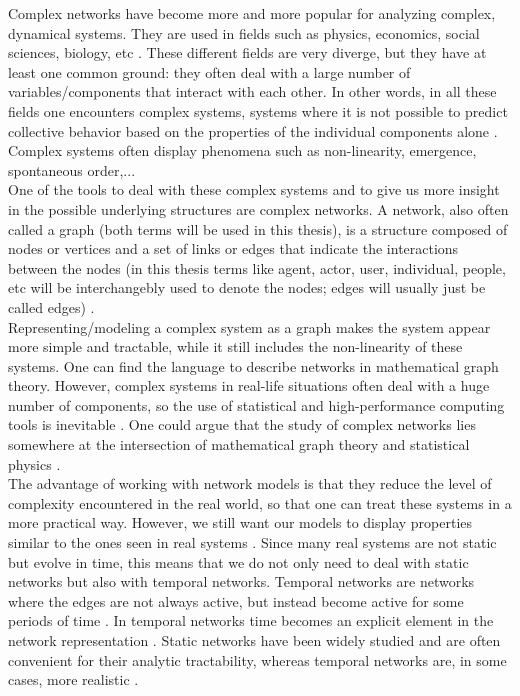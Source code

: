 \documentclass[11 pt , letterpaper , twoside , openright]{book}
\begin{document}
Complex networks have become more and more popular for analyzing complex, dynamical systems. They are used in fields such as physics, economics, social sciences, biology, etc \cite{Costa2008}. These different fields are very diverge, but they have at least one common ground: they often deal with a large number of variables/components that interact with each other. In other words, in all these fields one encounters complex systems, systems where it is not possible to predict collective behavior based on the properties of the individual components alone \cite{Mata2020}. Complex systems often display phenomena such as non-linearity, emergence, spontaneous order,...
\\
\newline
One of the tools to deal with these complex systems and to give us more insight in the possible underlying structures are complex networks. A network, also often called a graph (both terms will be used in this thesis), is a structure composed of nodes or vertices and a set of links or edges that indicate the interactions between the nodes (in this thesis terms like agent, actor, user, individual, people, etc will be interchangebly used to denote the nodes; edges will usually just be called edges) \cite{Mata2020}.\\
\newline
Representing/modeling a complex system as a graph makes the system appear more simple and tractable, while it still includes the non-linearity of these systems. One can find the language to describe networks in mathematical graph theory. However, complex systems in real-life situations often deal with a huge number of components, so the use of statistical and high-performance computing tools is inevitable \cite{Mata2020}. One could argue that the study of complex networks lies somewhere at the intersection of mathematical graph theory and statistical physics \cite{F.Costa2007}.\\
\newline
The advantage of working with network models is that they reduce the level of complexity encountered in the real world, so that one can treat these systems in a more practical way. However, we still want our models to display properties similar to the ones seen in real systems \cite{Mata2020}. Since many real systems are not static but evolve in time, this means that we do not only need to deal with static networks but also with temporal networks. Temporal networks are networks where the edges are not always active, but instead become active for some periods of time \cite{Holme2012}. In temporal networks time becomes an explicit element in the network representation \cite{Holme2012}. Static networks have been widely studied and are often convenient for their analytic tractability, whereas temporal networks are, in some cases, more realistic \cite{Mata2020}.\\
\end{document}
